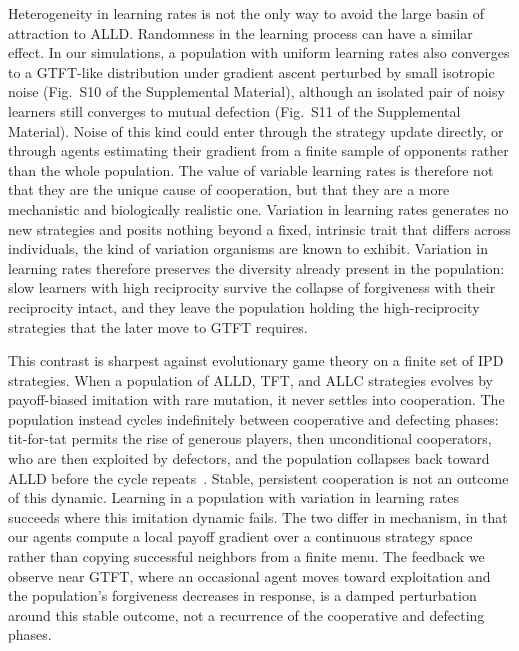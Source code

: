\documentclass[10pt]{article}
\begin{document}
Heterogeneity in learning rates is not the only way to avoid the large basin of attraction to ALLD. Randomness in the learning process can have a similar effect. In our simulations, a population with uniform learning rates also converges to a GTFT-like distribution under gradient ascent perturbed by small isotropic noise (Fig.~S10 of the Supplemental Material), although an isolated pair of noisy learners still converges to mutual defection (Fig.~S11 of the Supplemental Material). Noise of this kind could enter through the strategy update directly, or through agents estimating their gradient from a finite sample of opponents rather than the whole population.
The value of variable learning rates is therefore not that they are the unique cause of cooperation, but that they are a more mechanistic and biologically realistic one. Variation in learning rates generates no new strategies and posits nothing beyond a fixed, intrinsic trait that differs across individuals, the kind of variation organisms are known to exhibit. Variation in learning rates therefore preserves the diversity already present in the population: slow learners with high reciprocity survive the collapse of forgiveness with their reciprocity intact, and they leave the population holding the high-reciprocity strategies that the later move to GTFT requires.

This contrast is sharpest against evolutionary game theory on a finite set of IPD strategies. When a population of ALLD, TFT, and ALLC strategies evolves by payoff-biased imitation with rare mutation, it never settles into cooperation. The population instead cycles indefinitely between cooperative and defecting phases: tit-for-tat permits the rise of generous players, then unconditional cooperators, who are then exploited by defectors, and the population collapses back toward ALLD before the cycle repeats~\cite{nowak1992-TitTatHeterogeneous,imhof2005-EvolutionaryCyclesCooperation,imhof2010-StochasticEvolutionaryDynamics,nowak2006-EvolutionaryDynamicsExploring}. Stable, persistent cooperation is not an outcome of this dynamic. Learning in a population with variation in learning rates succeeds where this imitation dynamic fails. The two differ in mechanism, in that our agents compute a local payoff gradient over a continuous strategy space rather than copying successful neighbors from a finite menu. The feedback we observe near GTFT, where an occasional agent moves toward exploitation and the population's forgiveness decreases in response, is a damped perturbation around this stable outcome, not a recurrence of the cooperative and defecting phases.
\end{document}
